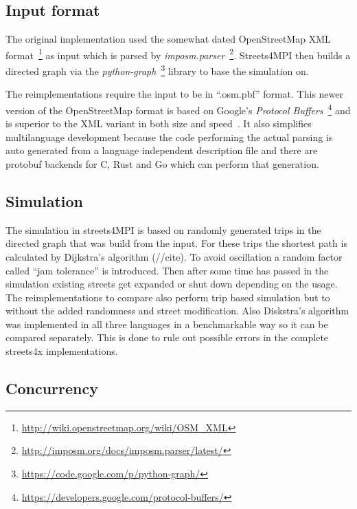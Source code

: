 \subsection*{Input format}
\label{subsec:Approach::Differences::Input}

The original implementation used the somewhat dated OpenStreetMap XML format~\footnote{\url{http://wiki.openstreetmap.org/wiki/OSM_XML}} as input which is parsed by \textit{imposm.parser}~\footnote{\url{http://imposm.org/docs/imposm.parser/latest/}}. Streets4MPI then builds a directed graph via the \textit{python-graph}~\footnote{\url{https://code.google.com/p/python-graph/}} library to base the simulation on.\cite{streets_report}

The reimplementations require the input to be in ``.osm.pbf'' format. This newer version of the OpenStreetMap format is based on Google's \textit{Protocol Buffers}~\footnote{\url{https://developers.google.com/protocol-buffers/}} and is superior to the XML variant in both size and speed~\cite{osm_wiki_pbf}. It also simplifies multilanguage development because the code performing the actual parsing is auto generated from a language independent description file and there are protobuf backends for C, Rust and Go which can perform that generation.

\subsection*{Simulation}
\label{subsec:Approach::Differences::Simulation}

The simulation in streets4MPI is based on randomly generated trips in the directed graph that was build from the input. For these trips the shortest path is calculated by Dijkstra's algorithm (//cite). To avoid oscillation a random factor called ``jam tolerance'' is introduced. Then after some time has passed in the simulation existing streets get expanded or shut down depending on the usage. The reimplementations to compare also perform trip based simulation but to without the added randomness and street modification. Also Diskstra's algorithm was implemented in all three languages in a benchmarkable way so it can be compared separately. This is done to rule out possible errors in the complete streets4x implementations.

\subsection*{Concurrency}
\label{subsec:Approach::Differences::Concurrency}

